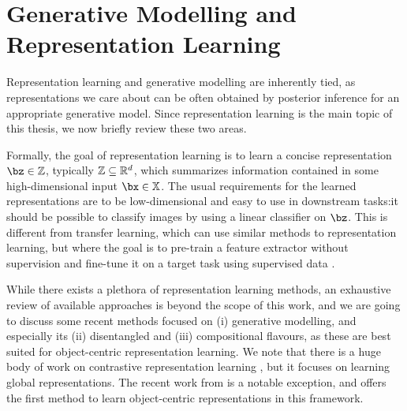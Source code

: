 \section{Generative Modelling and Representation Learning}
\label{sec:repr_learning}

    Representation learning and generative modelling are inherently tied, as representations we care about can be often obtained by posterior inference for an appropriate generative model. 
    Since representation learning is the main topic of this thesis, we now briefly review these two areas.
    
	Formally, the goal of representation learning is to learn a concise representation $\bz \in \mathbb{Z}$, typically $\mathbb{Z} \subseteq \mathbb{R}^d$, which summarizes information contained in some high-dimensional input $\bx \in \mathbb{X}$.
	The usual requirements for the learned representations are to be low-dimensional and easy to use in downstream tasks:\eg it should be possible to classify images by using a linear classifier on $\bz$.
	This is different from transfer learning, which can use similar methods to representation learning, but where the goal is to pre-train a feature extractor without supervision and fine-tune it on a target task using supervised data \citep{He2019moco,Devlin2019bert}.
	
	While there exists a plethora of representation learning methods, an exhaustive review of available approaches is beyond the scope of this work, and we are going to discuss some recent methods focused on 
		(i) generative modelling, and especially its 
		(ii) disentangled and
		(iii) compositional flavours,
	as these are best suited for object-centric representation learning.
	We note that there is a huge body of work on contrastive representation learning \citep{Oord2016cond,Tschannen2019onmi,Hjelm2019deepinfomax,He2019moco,Schmidhuber1992pm}, but it focuses on learning global representations.
	The recent work from \cite{Kipf2019cswm} is a notable exception, and offers the first method to learn object-centric representations in this framework.
	
